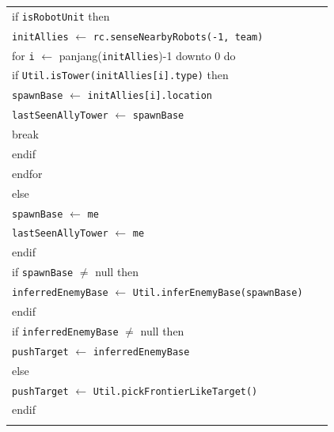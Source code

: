 \documentclass{article}
\newenvironment{pseudobox}
{
\centering
\begin{longtable}{|p{0.94\linewidth}|}
\hline
}
{
\\ \hline
\end{longtable}
\vspace{0.05cm}
}
\begin{document}
\begin{enumerate}[label=\alph*.]
\begin{enumerate}[label=\alph*.]
\begin{pseudobox}
\hspace*{1.5em}if \texttt{isRobotUnit} then \\
\hspace*{3em}\texttt{initAllies} $\leftarrow$ \texttt{rc.senseNearbyRobots(-1, team)} \\
\hspace*{3em}for \texttt{i} $\leftarrow$ panjang(\texttt{initAllies})-1 downto 0 do \\
\hspace*{4.5em}if \texttt{Util.isTower(initAllies[i].type)} then \\
\hspace*{6em}\texttt{spawnBase} $\leftarrow$ \texttt{initAllies[i].location} \\
\hspace*{6em}\texttt{lastSeenAllyTower} $\leftarrow$ \texttt{spawnBase} \\
\hspace*{6em}break  \\
\hspace*{4.5em}endif \\
\hspace*{3em}endfor \\
\hspace*{1.5em}else \\
\hspace*{3em}\texttt{spawnBase} $\leftarrow$ \texttt{me} \\
\hspace*{3em}\texttt{lastSeenAllyTower} $\leftarrow$ \texttt{me} \\
\hspace*{1.5em}endif \\

\hspace*{1.5em}if \texttt{spawnBase} $\neq$ null then \\
\hspace*{3em}\texttt{inferredEnemyBase} $\leftarrow$ \texttt{Util.inferEnemyBase(spawnBase)} \\
\hspace*{1.5em}endif \\

\hspace*{1.5em}if \texttt{inferredEnemyBase} $\neq$ null then \\
\hspace*{3em}\texttt{pushTarget} $\leftarrow$ \texttt{inferredEnemyBase} \\
\hspace*{1.5em}else \\
\hspace*{3em}\texttt{pushTarget} $\leftarrow$ \texttt{Util.pickFrontierLikeTarget()} \\
\hspace*{1.5em}endif \\


\end{pseudobox}
\end{enumerate}
\end{enumerate}
\end{document}

